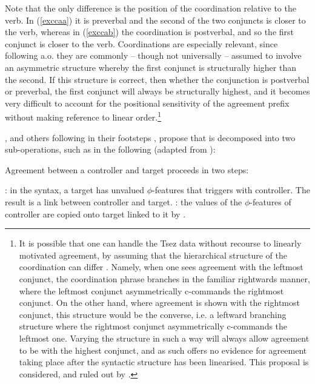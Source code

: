 \documentclass[output=paper
,modfonts
,nonflat]{langsci/langscibook}
\begin{document}
Note that the only difference is the position of the coordination relative to the verb.
In (\ref{exccaa}) it is preverbal and the second of the two conjuncts is closer to the verb, whereas in (\ref{exccab}) the coordination is postverbal, and so the first conjunct is closer to the verb.
Coordinations are especially relevant, since following \citet{munn1993} a.o. they are commonly -- though not universally \citep[see][]{borsley2005} -- assumed to involve an asymmetric structure whereby the first conjunct is structurally higher than the second.
If this structure is correct, then whether the conjunction is postverbal or preverbal, the first conjunct will always be structurally highest, and it becomes very difficult to account for the positional sensitivity of the agreement prefix without making reference to linear order.\footnote{It is possible that one can handle the Tsez data without recourse to linearly motivated agreement, by assuming that the hierarchical structure of the coordination can differ \citep[cf.][]{johannessen1996}.
	Namely, when one sees agreement with the leftmost conjunct, the coordination phrase branches in the familiar rightwards manner, where the leftmost conjunct asymmetrically c-commands the rightmost conjunct.
	On the other hand, where agreement is shown with the rightmost conjunct, this structure would be the converse, i.e. a leftward branching structure where the rightmost conjunct asymmetrically c-commands the leftmost one.
	Varying the structure in such a way will always allow agreement to be with the highest conjunct, and as such offers no evidence for agreement taking place after the syntactic structure has been linearised.
	This proposal is considered, and ruled out by \citet{benmamounetal2009}.}

\citet{benmamounetal2009}, and others following in their footsteps \citep[including a.o.][]{arreginevins2012,bhattwalkow2013,smithdiss,smithagrhierarchy, smithsse},  propose that \agr{} is decomposed into two sub-operations, such as in the following (adapted from \citealp{arreginevins2012}):

\begin{exe}
	\ex
	Agreement between a controller and target proceeds in two steps: 
	\begin{xlista}
		\ex \agrl: in the syntax, a target has unvalued $\phi$-features that triggers \agr{} with controller. The result is a link between controller and target.
		\ex \agrc: the values of the $\phi$-features of controller are copied onto target linked to it by \agrl.
	\end{xlista}
\end{exe}
\end{document}
